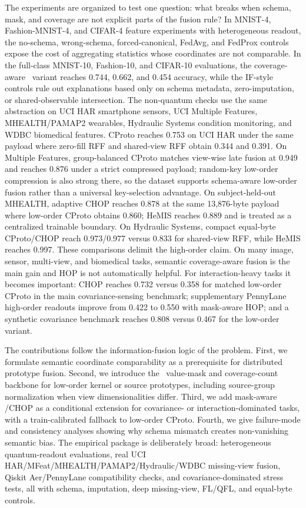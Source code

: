 The experiments are organized to test one question: what breaks when schema, mask, and coverage are not explicit parts of the fusion rule? In MNIST-4, Fashion-MNIST-4, and CIFAR-4 feature experiments with heterogeneous readout, the no-schema, wrong-schema, forced-canonical, FedAvg, and FedProx controls expose the cost of aggregating statistics whose coordinates are not comparable. In the full-class MNIST-10, Fashion-10, and CIFAR-10 evaluations, the coverage-aware \hopmethod\ variant reaches 0.744, 0.662, and 0.454 accuracy, while the IF-style controls rule out explanations based only on schema metadata, zero-imputation, or shared-observable intersection. The non-quantum checks use the same abstraction on UCI HAR smartphone sensors, UCI Multiple Features, MHEALTH/PAMAP2 wearables, Hydraulic Systems condition monitoring, and WDBC biomedical features. CProto reaches 0.753 on UCI HAR under the same payload where zero-fill RFF and shared-view RFF obtain 0.344 and 0.391. On Multiple Features, group-balanced CProto matches view-wise late fusion at 0.949 and reaches 0.876 under a strict compressed payload; random-key low-order compression is also strong there, so the dataset supports schema-aware low-order fusion rather than a universal key-selection advantage. On subject-held-out MHEALTH, adaptive CHOP reaches 0.878 at the same 13,876-byte payload where low-order CProto obtains 0.860; HeMIS reaches 0.889 and is treated as a centralized trainable boundary. On Hydraulic Systems, compact equal-byte CProto/CHOP reach 0.973/0.977 versus 0.833 for shared-view RFF, while HeMIS reaches 0.997. These comparisons delimit the high-order claim. On many image, sensor, multi-view, and biomedical tasks, semantic coverage-aware fusion is the main gain and HOP is not automatically helpful. For interaction-heavy tasks it becomes important: CHOP reaches 0.732 versus 0.358 for matched low-order CProto in the main covariance-sensing benchmark; supplementary PennyLane high-order readouts improve from 0.422 to 0.550 with mask-aware HOP; and a synthetic covariance benchmark reaches 0.808 versus 0.467 for the low-order variant.

The contributions follow the information-fusion logic of the problem. First, we formulate semantic coordinate comparability as a prerequisite for distributed prototype fusion. Second, we introduce the \method\ value-mask and coverage-count backbone for low-order kernel or source prototypes, including source-group normalization when view dimensionalities differ. Third, we add mask-aware \hopmethod/CHOP as a conditional extension for covariance- or interaction-dominated tasks, with a train-calibrated fallback to low-order CProto. Fourth, we give failure-mode and consistency analyses showing why schema mismatch creates non-vanishing semantic bias. The empirical package is deliberately broad: heterogeneous quantum-readout evaluations, real UCI HAR/MFeat/MHEALTH/PAMAP2/Hydraulic/WDBC missing-view fusion, Qiskit Aer/PennyLane compatibility checks, and covariance-dominated stress tests, all with schema, imputation, deep missing-view, FL/QFL, and equal-byte controls.





